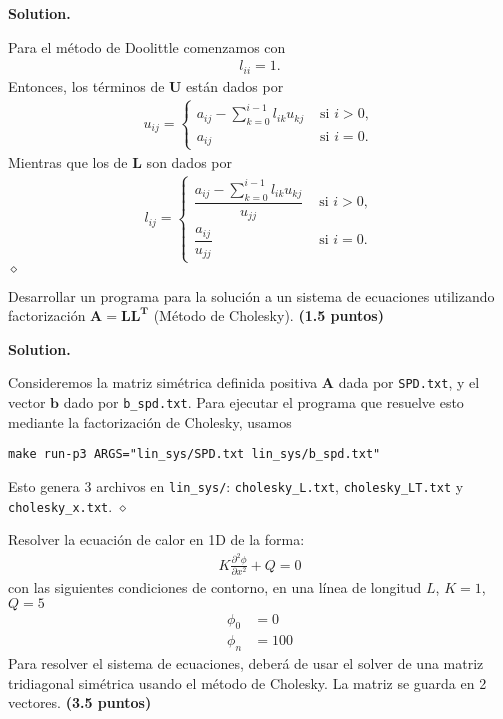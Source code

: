 \documentclass{article}
\theoremstyle{problemstyle}
\newenvironment{solution}{%
  \begin{mdframed}[linewidth=0.8pt,linecolor=Gray,backgroundcolor=Gray!5,roundcorner=5pt]%
  \noindent\textbf{Solution.}%
}{%
\hfill $ \diamond $ 
  \end{mdframed}%
}
\begin{document}
\begin{solution}
	Para el m\'etodo de Doolittle comenzamos con
	\begin{align*}
		l_{ii} = 1.
	\end{align*}
	Entonces, los t\'erminos de $ \mathbf{U} $ est\'an dados por
	\begin{align*}
		u_{ij} =
		\begin{cases}
			a_{ij} - \sum_{k=0}^{i-1}l_{ik}u_{kj} & \text{ si } i>0,   \\
			a_{ij}                                & \text{ si } i = 0.
		\end{cases}
	\end{align*}
	Mientras que los de $ \mathbf{L} $ son dados por
	\begin{align*}
		l_{ij} =
		\begin{cases}
			\dfrac{a_{ij} - \sum_{k=0}^{i-1}l_{ik}u_{kj}}{u_{jj}} & \text{ si } i>0,   \\
			\dfrac{a_{ij}}{u_{jj}}                                & \text{ si } i = 0.
		\end{cases}
	\end{align*}
\end{solution}
\pagebreak
\begin{problem}
Desarrollar un programa para la soluci\'on a un sistema de ecuaciones
utilizando factorizaci\'on $ \mathbf{A} = \mathbf{LL^T} $ (M\'etodo de
Cholesky). \textbf{(1.5 puntos)}
\end{problem}

\begin{solution}
	Consideremos la matriz sim\'etrica definida positiva $ \mathbf{A} $ dada por \texttt{SPD.txt}, y el vector $ \mathbf{b} $ dado por \texttt{b\_spd.txt}. Para ejecutar el programa que resuelve esto mediante la factorizaci\'on de Cholesky, usamos

	\begin{center}
		\texttt{make run-p3 ARGS="lin\_sys/SPD.txt lin\_sys/b\_spd.txt"}
	\end{center}
	Esto genera 3 archivos en \texttt{lin\_sys/}: \texttt{cholesky\_L.txt}, \texttt{cholesky\_LT.txt} y \texttt{cholesky\_x.txt}.
\end{solution}

\begin{problem}
Resolver la ecuaci\'on de calor en 1D de la forma:
\begin{align*}
	K \frac{\partial^2\phi}{\partial x^2} + Q = 0
\end{align*}
con las siguientes condiciones de contorno, en una l\'inea de longitud $ L$,
$ K = 1 $, $ Q = 5 $
\begin{align*}
	\phi_0 & = 0   \\
	\phi_n & = 100
\end{align*}
Para resolver el sistema de ecuaciones, deber\'a de usar el solver de una
matriz tridiagonal sim\'etrica usando el m\'etodo de Cholesky. La matriz se
guarda en 2 vectores. \textbf{(3.5 puntos)}

\end{problem}
\end{document}
